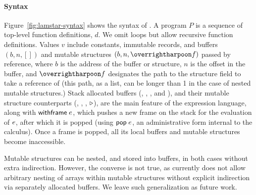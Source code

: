\paragraph{Syntax} Figure~\ref{fig:lamstar-syntax} shows the syntax
of \lamstar. A program $P$ is a sequence of top-level function
definitions, $d$. We omit loops but allow recursive function definitions.
%
Values $v$ include constants, immutable records, and buffers $(b, n, [])$ and mutable structures $(b, n, \ls{\fd})$
passed by reference, where $b$ is the address of the buffer or structure, $n$ is the
offset in the buffer, and $\ls{\fd}$ designates the path to the structure field to take a reference of (this path, as a list, can be longer than 1 in the case of nested mutable structures.)
%
Stack allocated buffers (, , , and
), and their mutable structure counterparts (, , , $\triangleright$), are the main feature of the expression language, along
with $\text{\textsf{withframe}}\;e$, which pushes a new frame on the stack for
the evaluation of $e$, after which it is popped (using
$\text{\textsf{pop}}\;e$, an administrative form internal to the calculus).
%
Once a frame is popped, all its local buffers and mutable structures become inaccessible.

Mutable structures can be nested, and stored into buffers, in both cases without extra indirection. However, the converse is not true, as \lamstar currently does not allow arbitrary nesting of arrays within mutable structures without explicit indirection via separately allocated buffers. We leave such generalization as future work.









